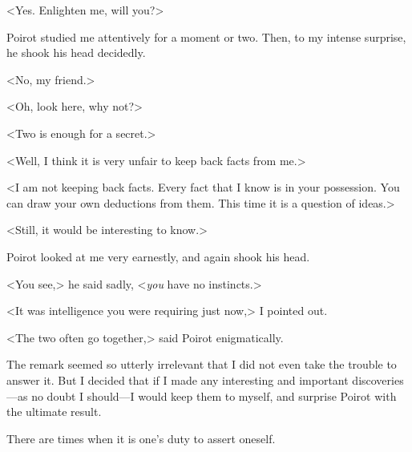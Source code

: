 <Yes. Enlighten me, will you?> 

 Poirot studied me attentively for a moment or two. Then, to my intense surprise, he shook his head decidedly. 

 <No, my friend.> 

 <Oh, look here, why not?> 

 <Two is enough for a secret.> 

 <Well, I think it is very unfair to keep back facts from me.> 

 <I am not keeping back facts. Every fact that I know is in your possession. You can draw your own deductions from them. This time it is a question of ideas.> 

 <Still, it would be interesting to know.> 

 Poirot looked at me very earnestly, and again shook his head. 

 <You see,> he said sadly, <\emph{you} have no instincts.> 

 <It was intelligence you were requiring just now,> I pointed out. 

 <The two often go together,> said Poirot enigmatically. 

 The remark seemed so utterly irrelevant that I did not even take the trouble to answer it. But I decided that if I made any interesting and important discoveries—as no doubt I should—I would keep them to myself, and surprise Poirot with the ultimate result. 

 There are times when it is one's duty to assert oneself. 